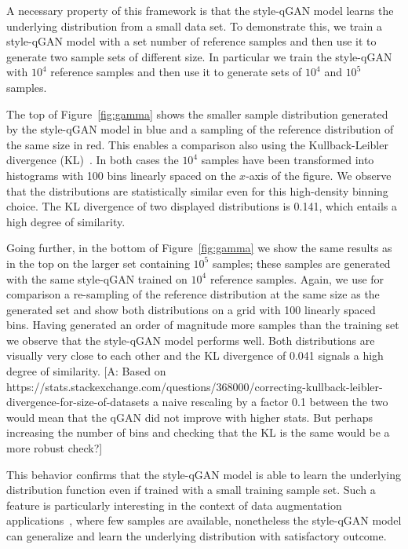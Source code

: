 \documentclass[twocolumn,preprintnumbers,superscriptaddress]{revtex4-2}
\newcommand{\commentAF}[1]{{\color{cyan} {[A: #1]}}}
\begin{document}
A necessary property of this framework is that the style-qGAN model learns the underlying distribution from a small data set. To demonstrate this, we train a style-qGAN model with a set number of reference samples and then use it to generate two sample sets of different size. In particular we train the style-qGAN with $10^4$ reference samples and then use it to generate sets of $10^4$ and $10^5$ samples.

The top of Figure~\ref{fig:gamma} shows the smaller sample distribution generated by the style-qGAN model in blue and a sampling of the reference distribution of the same size in red. This enables a comparison also using the Kullback-Leibler divergence (KL)~\cite{kullback1951information}. In both cases the $10^4$ samples have been transformed into histograms with 100 bins linearly spaced on the $x$-axis of the figure. We observe that the distributions are statistically similar even for this high-density binning choice. The KL divergence of two displayed distributions is 0.141, which entails a high degree of similarity.

Going further, in the bottom of Figure~\ref{fig:gamma} we show the same results as in the top on the larger set containing $10^5$ samples; these samples are generated with the same style-qGAN trained on $10^4$ reference samples. Again, we use for comparison a re-sampling of the reference distribution at the same size as the generated set and show both distributions on a grid with 100 linearly spaced bins. 
%
Having generated an order of magnitude more samples than the training set we observe that the style-qGAN model performs well. Both distributions are visually very close to each other and the KL divergence of 0.041 signals a high degree of similarity. 
\commentAF{Based on https://stats.stackexchange.com/questions/368000/correcting-kullback-leibler-divergence-for-size-of-datasets a naive rescaling by a factor 0.1 between the two would mean that the qGAN did not improve with higher stats. But perhaps increasing the number of bins and checking that the KL is the same would be a more robust check?}

%
This behavior confirms that the style-qGAN model is able to learn the underlying
distribution function even if trained with a small training sample set. Such a
feature is particularly interesting in the context of data augmentation
applications~\cite{frid2018synthetic,tanaka2019data}, where few samples are
available, nonetheless the style-qGAN model can generalize and learn the underlying distribution
with satisfactory outcome.
\end{document}
